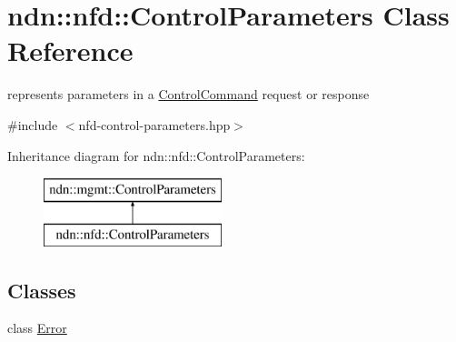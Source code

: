 \hypertarget{classndn_1_1nfd_1_1ControlParameters}{}\section{ndn\+:\+:nfd\+:\+:Control\+Parameters Class Reference}
\label{classndn_1_1nfd_1_1ControlParameters}


represents parameters in a \hyperlink{classndn_1_1nfd_1_1ControlCommand}{Control\+Command} request or response  




{\ttfamily \#include $<$nfd-\/control-\/parameters.\+hpp$>$}

Inheritance diagram for ndn\+:\+:nfd\+:\+:Control\+Parameters\+:\begin{figure}[H]
\begin{center}
\leavevmode
\includegraphics[height=2.000000cm]{classndn_1_1nfd_1_1ControlParameters}
\end{center}
\end{figure}
\subsection*{Classes}
\begin{DoxyCompactItemize}
\item 
class \hyperlink{classndn_1_1nfd_1_1ControlParameters_1_1Error}{Error}
\end{DoxyCompactItemize}
